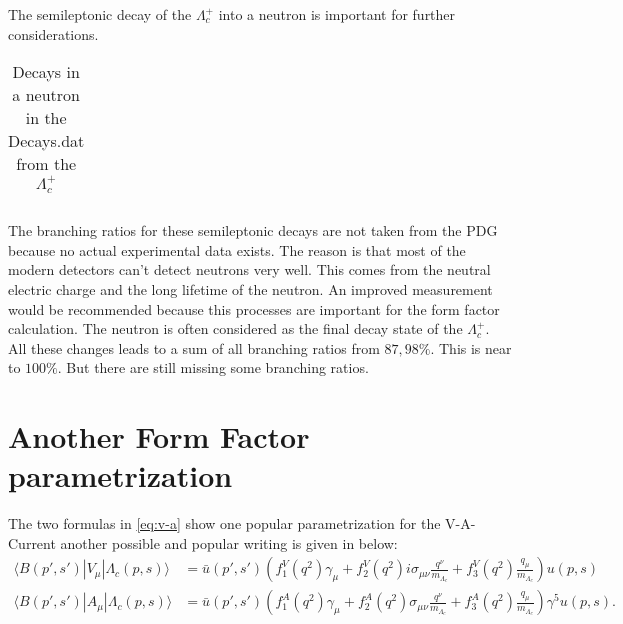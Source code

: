 The semileptonic decay of the \(\Lambda_c^+\) into a neutron is important for 
further considerations.
\begin{longtable}{| c | c |}
  \caption{Decays in a neutron in the Decays.dat from the \(\Lambda_c^+\)}\label{ta:ndecays}\\ 
  \hline
  
\end{longtable}
The branching ratios for these semileptonic decays are not taken from the PDG because
no actual experimental data exists. The reason is that 
most of the modern detectors can't detect neutrons very well. This comes from 
the neutral electric charge and the long lifetime of the neutron. An improved 
measurement would be recommended because this processes are important for 
the form factor calculation. The neutron is often considered as the final 
decay state of the \(\Lambda_c^+\).\\
All these changes leads to a sum of all branching ratios from \(87,98\%\). 
This is near to \(100\%\). But there are still missing some branching 
ratios.

\section{Another Form Factor parametrization}
The two formulas in {\eqref{eq:v-a}} show one popular parametrization for 
the V-A-Current another possible and popular writing is given in below:
\begin{align}
  \langle B(p', s') | V_\mu | \Lambda_c(p, s) \rangle & = \bar{u}(p', s') 
  \left( f^V_1(q^2) \gamma_\mu + f^V_2(q^2)i\sigma_{\mu\nu}\frac{q^\nu}{m_{\Lambda_c}} + 
  f^V_3(q^2)\frac{q_\mu}{m_{\Lambda_c}} \right) u(p, s) \nonumber \\
  \langle B(p', s') | A_\mu | \Lambda_c(p, s) \rangle & = \bar{u}(p', s') 
  \left( f^A_1(q^2) \gamma_\mu + f^A_2(q^2)\sigma_{\mu\nu}\frac{q^\nu}{m_{\Lambda_c}} + 
  f^A_3(q^2)\frac{q_\mu}{m_{\Lambda_c}} \right) \gamma^5 u(p, s). \label{eq:v-a-q}
\end{align}


